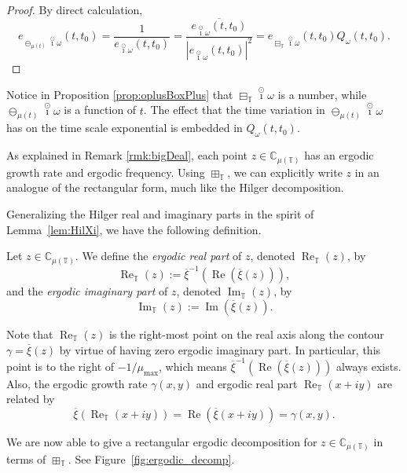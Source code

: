 \documentclass[reqno]{amsart}
\DeclareMathOperator{\myRe}{Re}
\DeclareMathOperator{\myIm}{Im}
\begin{document}
\begin{proof}
By direct calculation,
 $$
 e_{\ominus_{\mu(t)} \overset{\odot}{\imath} \omega}(t,t_0) = \frac{1}{e_{\overset{\odot}{\imath} \omega}(t,t_0)}
 = \frac{\overline{e_{\overset{\odot}{\imath} \omega}(t,t_0)}}{|e_{\overset{\odot}{\imath} \omega}(t,t_0)|^2}
 = e_{\boxminus_{\mathbb{T}} \overset{\odot}{\imath} \omega}(t,t_0) Q_{\omega}(t,t_0).
 $$
\end{proof}

Notice in Proposition \ref{prop:oplusBoxPlus} that $\boxminus_{\mathbb{T}} \overset{\odot}{\imath} \omega$ is a
number, while $\ominus_{\mu(t)} \overset{\odot}{\imath} \omega$ is a function of $t$.
The effect that the time variation in $\ominus_{\mu(t)} \overset{\odot}{\imath} \omega$ has on the
time scale exponential is embedded in $Q_{\omega}(t,t_0)$.

As explained in Remark \ref{rmk:bigDeal}, each point $z \in \mathbb{C}_{\mu(\mathbb{T})}$
has an ergodic growth rate and ergodic frequency. Using $\boxplus_{\mathbb{T}}$, we can
explicitly write $z$ in an analogue of the rectangular form, much like the Hilger
decomposition.

Generalizing the Hilger real and imaginary parts in the spirit of Lemma~\ref{lem:HilXi},
we have the following definition.

\begin{definition} \rm
Let $z \in \mathbb{C}_{\mu(\mathbb{T})}$. We define the \emph{ergodic real part} of $z$, denoted
$\myRe_{\mathbb{T}}(z)$, by
 \[ %
 \myRe_{\mathbb{T}}(z):=\overline{\xi}^{-1}(\myRe(\overline{\xi}(z))),
 \]
and the \emph{ergodic imaginary part} of $z$, denoted $\myIm_{\mathbb{T}}(z)$, by
\[
\myIm_{\mathbb{T}}(z):=\myIm(\overline{\xi}(z)).
\]\end{definition}

Note that $\myRe_{\mathbb{T}}(z)$ is the right-most point on the real axis along the contour
$\gamma = \overline{\xi}(z)$ by virtue of having zero ergodic imaginary part. In particular,
this point is to the right of $-1/\mu_{\max}$, which means $\overline{\xi}^{-1}(\myRe(\overline{\xi}(z)))$
always exists. Also, the ergodic growth rate $\gamma(x,y)$ and ergodic real part
$\myRe_{\mathbb{T}}(x+iy)$ are related by
$$
 \overline{\xi}(\myRe_{\mathbb{T}}(x+iy)) = \myRe(\overline{\xi}(x+iy)) = \gamma(x,y).
$$

We are now able to give a rectangular ergodic decomposition for $z \in \mathbb{C}_{\mu(\mathbb{T})}$
in terms of $\boxplus_\mathbb{T}$. See Figure~\ref{fig:ergodic_decomp}.
\end{document}
